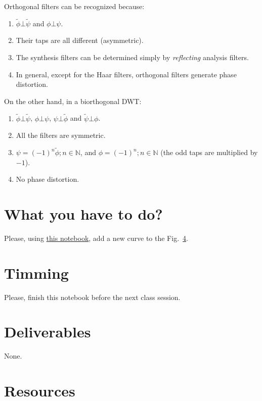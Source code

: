 Orthogonal filters can be recognized because:
\begin{enumerate}
\item $\tilde\phi\bot\tilde\psi$ and $\phi\bot\psi$.
\item Their taps are all different (asymmetric).
\item The synthesis filters can be determined simply by
  \emph{reflecting} analysis filters.
\item In general, except for the Haar filters, orthogonal filters
  generate phase distortion.
\end{enumerate}

On the other hand, in a biorthogonal DWT:
\begin{enumerate}
\item $\tilde\phi\bot\tilde\psi$, $\phi\bot\psi$, $\psi\bot\tilde\phi$
  and $\tilde\psi\bot\phi$.
\item All the filters are symmetric.
\item $\psi=(-1)^n\tilde\phi; n\in\mathbb{N}$, and
  $\phi=(-1)^n; n\in\mathbb{N}$ (the odd taps are multiplied by $-1$).
\item No phase distortion.
\end{enumerate}

\section{What you have to do?}
  
Please, using \href{}{this notebook}, add a new curve to the Fig.~\ref{}.

\section{Timming}

Please, finish this notebook before the next class session.

\section{Deliverables}

None.

\section{Resources}


